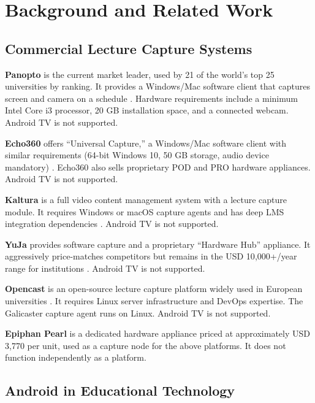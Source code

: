 \documentclass[12pt,a4paper]{article}
\begin{document}
\section{Background and Related Work}

\subsection{Commercial Lecture Capture Systems}

\textbf{Panopto} is the current market leader, used by 21 of the world's top 25 universities by ranking. It provides a Windows/Mac software client that captures screen and camera on a schedule \cite{panopto2024}. Hardware requirements include a minimum Intel Core i3 processor, 20 GB installation space, and a connected webcam. Android TV is not supported.

\textbf{Echo360} offers ``Universal Capture,'' a Windows/Mac software client with similar requirements (64-bit Windows 10, 50 GB storage, audio device mandatory) \cite{echo360}. Echo360 also sells proprietary POD and PRO hardware appliances. Android TV is not supported.

\textbf{Kaltura} is a full video content management system with a lecture capture module. It requires Windows or macOS capture agents and has deep LMS integration dependencies \cite{kaltura}. Android TV is not supported.

\textbf{YuJa} provides software capture and a proprietary ``Hardware Hub'' appliance. It aggressively price-matches competitors but remains in the USD 10{,}000+/year range for institutions \cite{yuja}. Android TV is not supported.

\textbf{Opencast} is an open-source lecture capture platform widely used in European universities \cite{opencast}. It requires Linux server infrastructure and DevOps expertise. The Galicaster capture agent runs on Linux. Android TV is not supported.

\textbf{Epiphan Pearl} is a dedicated hardware appliance priced at approximately USD 3{,}770 per unit, used as a capture node for the above platforms. It does not function independently as a platform.

\subsection{Android in Educational Technology}
\end{document}
